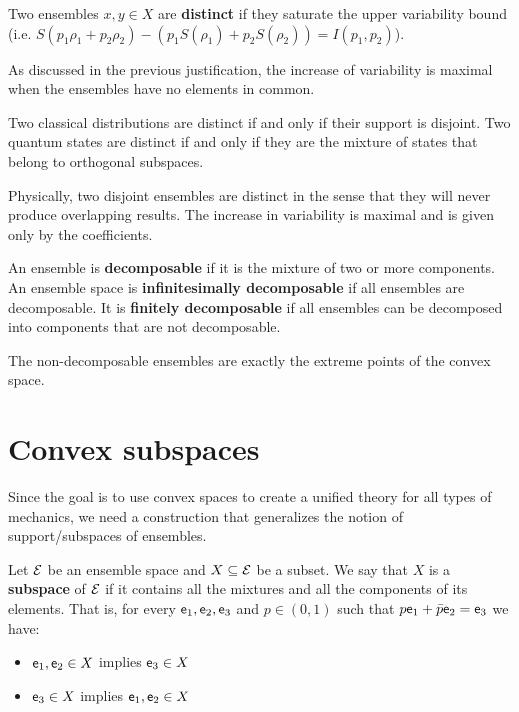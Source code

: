 \begin{defn}
	Two ensembles $x, y \in X$ are \textbf{distinct} if they saturate the upper variability bound (i.e. $S(p_1\rho_1 + p_2 \rho_2) - (p_1 S(\rho_1) + p_2 S(\rho_2)) = I(p_1, p_2)$).
\end{defn}

\begin{justification}
	As discussed in the previous justification, the increase of variability is maximal when the ensembles have no elements in common.
\end{justification}

\begin{remark}
	Two classical distributions are distinct if and only if their support is disjoint. Two quantum states are distinct if and only if they are the mixture of states that belong to orthogonal subspaces.
	
	Physically, two disjoint ensembles are distinct in the sense that they will never produce overlapping results. The increase in variability is maximal and is given only by the coefficients.
\end{remark}


\begin{defn}
	An ensemble is \textbf{decomposable} if it is the mixture of two or more components. An ensemble space is \textbf{infinitesimally decomposable} if all ensembles are decomposable. It is \textbf{finitely decomposable} if all ensembles can be decomposed into components that are not decomposable.
\end{defn}

\begin{remark}
	The non-decomposable ensembles are exactly the extreme points of the convex space.
\end{remark}


\section{Convex subspaces}

Since the goal is to use convex spaces to create a unified theory for all types of mechanics, we need a construction that generalizes the notion of support/subspaces of ensembles.

\begin{defn}
	Let $\mathcal{E}$ be an ensemble space and $X \subseteq \mathcal{E}$ be a subset. We say that $X$ is a \textbf{subspace} of $\mathcal{E}$ if it contains all the mixtures and all the components of its elements. That is, for every $\mathsf{e}_1, \mathsf{e}_2, \mathsf{e}_3$ and $p \in (0,1)$ such that $p\mathsf{e}_1 + \bar{p} \mathsf{e}_2 = \mathsf{e}_3$ we have:
	\begin{itemize}
	\item $\mathsf{e}_1, \mathsf{e}_2 \in X$ implies $\mathsf{e}_3 \in X$
	\item $\mathsf{e}_3 \in X$ implies $\mathsf{e}_1, \mathsf{e}_2 \in X$
\end{itemize}
\end{defn}

